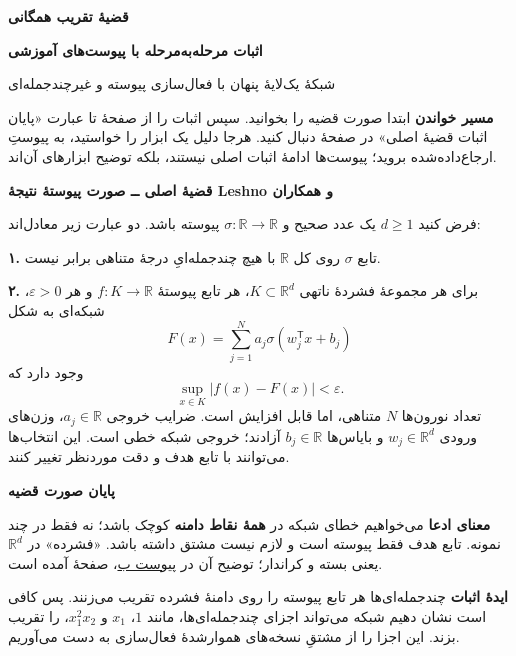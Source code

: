 \documentclass[12pt,a4paper]{article}
\newcommand{\R}{\mathbb R}
\newcommand{\subhead}[1]{\par\Needspace{3\baselineskip}\textbf{#1}\quad}
\newcommand{\appref}[2]{\hyperref[#1]{پیوست #2}، صفحهٔ \pageref{#1}}
\begin{document}
\label{main:theorem}
\begin{center}
{\LARGE\bfseries قضیهٔ تقریب همگانی\par}
\vspace{4pt}
{\large\bfseries اثبات مرحله‌به‌مرحله با پیوست‌های آموزشی\par}
\vspace{3pt}
شبکهٔ یک‌لایهٔ پنهان با فعال‌سازی پیوسته و غیرچندجمله‌ای
\end{center}

\subhead{مسیر خواندن}
ابتدا صورت قضیه را بخوانید. سپس اثبات را از صفحهٔ \pageref{main:start} تا عبارت «پایان اثبات قضیهٔ اصلی» در صفحهٔ \pageref{main:end} دنبال کنید. هرجا دلیل یک ابزار را خواستید، به پیوستِ ارجاع‌داده‌شده بروید؛ پیوست‌ها ادامهٔ اثبات اصلی نیستند، بلکه توضیح ابزارهای آن‌اند.

\begin{mainbox}
\textbf{قضیهٔ اصلی ــ صورت پیوستهٔ نتیجهٔ Leshno و همکاران}

فرض کنید $d\geq1$ یک عدد صحیح و $\sigma:\R\to\R$ پیوسته باشد. دو عبارت زیر معادل‌اند:

\textbf{۱.} تابع $\sigma$ روی کل $\R$ با هیچ چندجمله‌ایِ درجهٔ متناهی برابر نیست.

\textbf{۲.} برای هر مجموعهٔ فشردهٔ ناتهی $K\subset\R^d$، هر تابع پیوستهٔ $f:K\to\R$ و هر $\varepsilon>0$، شبکه‌ای به شکل
\[
F(x)=\sum_{j=1}^{N}a_j\sigma(w_j^{\mathsf T}x+b_j)
\]
وجود دارد که
\begin{equation}\label{eq:goal}
\sup_{x\in K}|f(x)-F(x)|<\varepsilon.
\end{equation}
تعداد نورون‌ها $N$ متناهی، اما قابل افزایش است. ضرایب خروجی $a_j\in\R$، وزن‌های ورودی $w_j\in\R^d$ و بایاس‌ها $b_j\in\R$ آزادند؛ خروجی شبکه خطی است. این انتخاب‌ها می‌توانند با تابع هدف و دقت موردنظر تغییر کنند.

\hfill\textbf{پایان صورت قضیه}
\end{mainbox}

\subhead{معنای ادعا}
می‌خواهیم خطای شبکه در \textbf{همهٔ نقاط دامنه} کوچک باشد؛ نه فقط در چند نمونه. تابع هدف فقط پیوسته است و لازم نیست مشتق داشته باشد. «فشرده» در $\R^d$ یعنی بسته و کراندار؛ توضیح آن در \appref{app:compact}{ب} آمده است.

\subhead{ایدهٔ اثبات}
چندجمله‌ای‌ها هر تابع پیوسته را روی دامنهٔ فشرده تقریب می‌زنند. پس کافی است نشان دهیم شبکه می‌تواند اجزای چندجمله‌ای‌ها، مانند $1$، $x_1$ و $x_1^2x_2$، را تقریب بزند. این اجزا را از مشتقِ نسخه‌های هموارشدهٔ فعال‌سازی به دست می‌آوریم.
\end{document}
